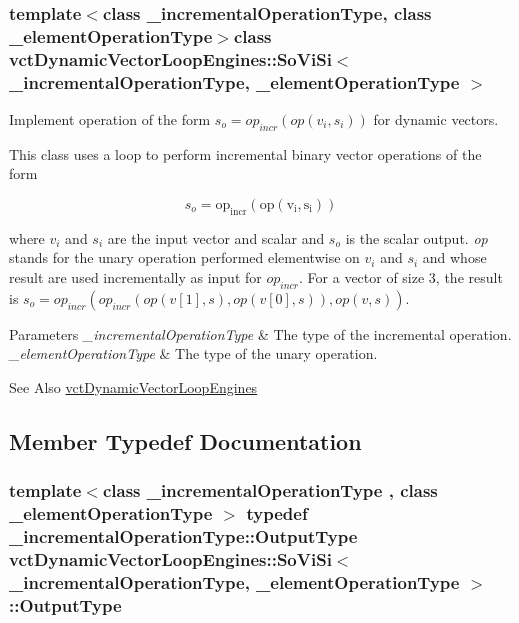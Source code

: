 \subsubsection*{template$<$class \-\_\-incremental\-Operation\-Type, class \-\_\-element\-Operation\-Type$>$class vct\-Dynamic\-Vector\-Loop\-Engines\-::\-So\-Vi\-Si$<$ \-\_\-incremental\-Operation\-Type, \-\_\-element\-Operation\-Type $>$}

Implement operation of the form $s_o = op_{incr}(op(v_i, s_i))$ for dynamic vectors. 

This class uses a loop to perform incremental binary vector operations of the form

\[ s_o = \mathrm{op_{incr}(\mathrm{op}(v_i, s_i))} \]

where $v_i$ and $s_i$ are the input vector and scalar and $s_o$ is the scalar output. {\itshape op} stands for the unary operation performed elementwise on $v_i$ and $s_i$ and whose result are used incrementally as input for $op_{incr}$. For a vector of size 3, the result is $s_o = op_{incr}(op_{incr}(op(v[1], s), op(v[0], s)), op(v, s))$.


\begin{DoxyParams}{Parameters}
{\em \-\_\-incremental\-Operation\-Type} & The type of the incremental operation.\\
\hline
{\em \-\_\-element\-Operation\-Type} & The type of the unary operation.\\
\hline
\end{DoxyParams}
\begin{DoxySeeAlso}{See Also}
\hyperlink{classvct_dynamic_vector_loop_engines}{vct\-Dynamic\-Vector\-Loop\-Engines} 
\end{DoxySeeAlso}


\subsection{Member Typedef Documentation}
\hypertarget{classvct_dynamic_vector_loop_engines_1_1_so_vi_si_a331ca8ec7bde5a60281e490a5d8c396a}{
\subsubsection[{Output\-Type}]{\setlength{\rightskip}{0pt plus 5cm}template$<$class \-\_\-incremental\-Operation\-Type , class \-\_\-element\-Operation\-Type $>$ typedef \-\_\-incremental\-Operation\-Type\-::\-Output\-Type {\bf vct\-Dynamic\-Vector\-Loop\-Engines\-::\-So\-Vi\-Si}$<$ \-\_\-incremental\-Operation\-Type, \-\_\-element\-Operation\-Type $>$\-::{\bf Output\-Type}}}\label{classvct_dynamic_vector_loop_engines_1_1_so_vi_si_a331ca8ec7bde5a60281e490a5d8c396a}


